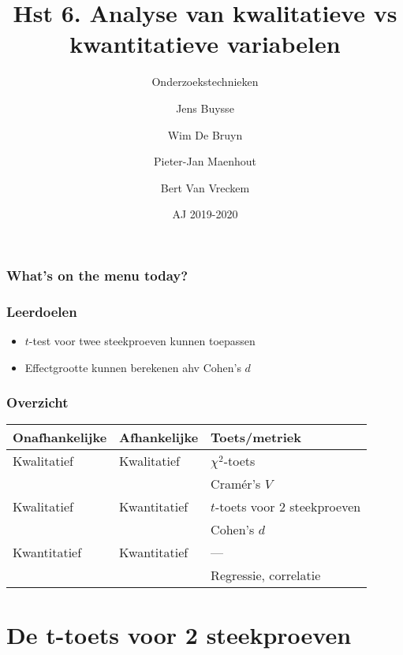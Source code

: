 \documentclass[aspectratio=169]{beamer}
\title[OZT: aan de slag]{Hst 6. Analyse van kwalitatieve vs kwantitatieve variabelen}
\subtitle{Onderzoekstechnieken}
\author{Jens Buysse \and Wim {De Bruyn} \and Pieter-Jan Maenhout \and Bert {Van Vreckem}}
\date{AJ 2019-2020}
\begin{document}
\begin{frame}
  \maketitle
\end{frame}

\begin{frame}
  \frametitle{What's on the menu today?}
  
  \tableofcontents
\end{frame}

\begin{frame}
  \frametitle{Leerdoelen}
  
  \begin{itemize}
    \item $t$-test voor twee steekproeven kunnen toepassen
    \item Effectgrootte kunnen berekenen ahv Cohen's $d$
  \end{itemize}
\end{frame}

\begin{frame}
  \frametitle{Overzicht}
  \centering
  \begin{tabular}{lll}
    \toprule
    \textbf{Onafhankelijke} & \textbf{Afhankelijke} & \textbf{Toets/metriek}        \\
    \midrule
    Kwalitatief             & Kwalitatief           & $\chi^2$-toets                \\
    &                       & Cramér's $V$                  \\
    Kwalitatief             & Kwantitatief          & $t$-toets voor 2 steekproeven \\
    &                       & Cohen's $d$                   \\
    Kwantitatief            & Kwantitatief          & ---                           \\
    &                       & Regressie, correlatie         \\
    \bottomrule
  \end{tabular}
\end{frame}

\section{De t-toets voor 2 steekproeven}
\end{document}
